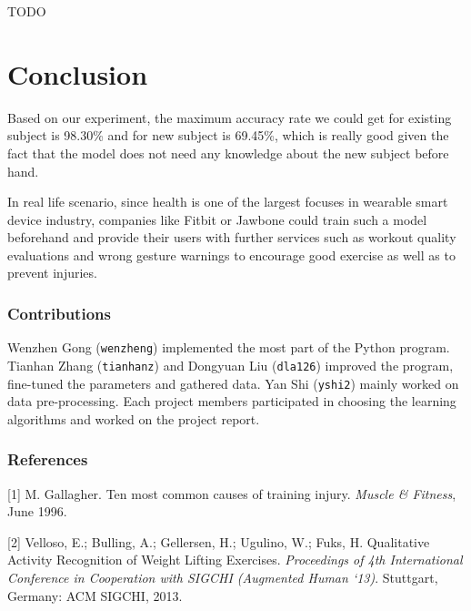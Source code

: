 \documentclass{article} %
\begin{document}
TODO

\section{Conclusion}

Based on our experiment, the maximum accuracy rate we could get for existing subject is 98.30\% and for new subject is 69.45\%, which is really good given the fact that the model does not need any knowledge about the new subject before hand.

In real life scenario, since health is one of the largest focuses in wearable smart device industry, companies like Fitbit or Jawbone could train such a model beforehand and provide their users with further services such as workout quality evaluations and wrong gesture warnings to encourage good exercise as well as to prevent injuries.

\subsubsection*{Contributions}

Wenzhen Gong (\texttt{wenzheng}) implemented the most part of the Python program. Tianhan Zhang (\texttt{tianhanz}) and Dongyuan Liu (\texttt{dla126}) improved the program, fine-tuned the parameters and gathered data. Yan Shi (\texttt{yshi2}) mainly worked on data pre-processing. Each project members participated in choosing the learning algorithms and worked on the project report.

\subsubsection*{References}

\small{
[1] M. Gallagher. Ten most common causes of training injury. {\it Muscle \& Fitness}, June 1996.

[2] Velloso, E.; Bulling, A.; Gellersen, H.; Ugulino, W.; Fuks, H. Qualitative Activity Recognition of Weight Lifting Exercises. {\it Proceedings of 4th International Conference in Cooperation with SIGCHI (Augmented Human `13)}. Stuttgart, Germany: ACM SIGCHI, 2013.
}
\end{document}
